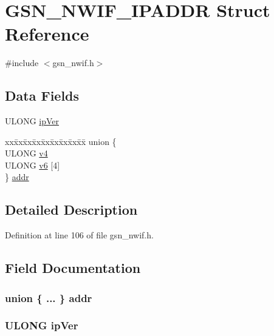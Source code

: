 \hypertarget{a00173}{
\section{GSN\_\-NWIF\_\-IPADDR Struct Reference}
\label{a00173}
}


{\ttfamily \#include $<$gsn\_\-nwif.h$>$}

\subsection*{Data Fields}
\begin{DoxyCompactItemize}
\item 
ULONG \hyperlink{a00173_a200913a21eacc89fb2646558a4218e60}{ipVer}
\item 
\begin{tabbing}
xx\=xx\=xx\=xx\=xx\=xx\=xx\=xx\=xx\=\kill
union \{\\
\>ULONG \hyperlink{a00173_a552e9ee12ea257a07324e81aac527331}{v4}\\
\>ULONG \hyperlink{a00173_a2632f465d3137898db0fb6622dd51398}{v6} \mbox{[}4\mbox{]}\\
\} \hyperlink{a00173_a848d263a18d1cf2f0b49460f87d6168a}{addr}\\

\end{tabbing}\end{DoxyCompactItemize}


\subsection{Detailed Description}


Definition at line 106 of file gsn\_\-nwif.h.



\subsection{Field Documentation}
\hypertarget{a00173_a848d263a18d1cf2f0b49460f87d6168a}{
\subsubsection[{addr}]{\setlength{\rightskip}{0pt plus 5cm}union \{ ... \}  {\bf addr}}}
\label{a00173_a848d263a18d1cf2f0b49460f87d6168a}
\hypertarget{a00173_a200913a21eacc89fb2646558a4218e60}{
\subsubsection[{ipVer}]{\setlength{\rightskip}{0pt plus 5cm}ULONG {\bf ipVer}}}
\label{a00173_a200913a21eacc89fb2646558a4218e60}


